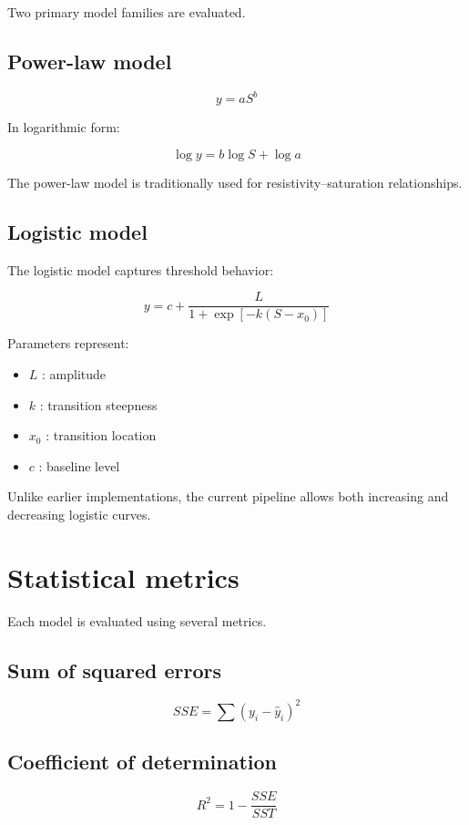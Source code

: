 \documentclass[11pt]{article}
\begin{document}
Two primary model families are evaluated.

\subsection{Power-law model}

\[
y = a S^b
\]

In logarithmic form:

\[
\log y = b \log S + \log a
\]

The power-law model is traditionally used for resistivity–saturation relationships.

\subsection{Logistic model}

The logistic model captures threshold behavior:

\[
y = c + \frac{L}{1 + \exp[-k(S-x_0)]}
\]

Parameters represent:

\begin{itemize}
\item $L$ : amplitude
\item $k$ : transition steepness
\item $x_0$ : transition location
\item $c$ : baseline level
\end{itemize}

Unlike earlier implementations, the current pipeline allows both increasing and decreasing logistic curves.

\section{Statistical metrics}

Each model is evaluated using several metrics.

\subsection{Sum of squared errors}

\[
SSE = \sum (y_i - \hat{y}_i)^2
\]

\subsection{Coefficient of determination}

\[
R^2 = 1 - \frac{SSE}{SST}
\]
\end{document}
